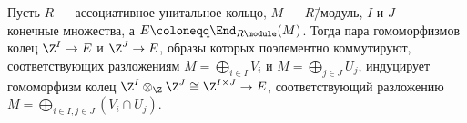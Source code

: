 \documentclass[
	extrafontsizes,
	11pt,
	hyphens,
]{memoir}
\begin{document}



\begin{observation}
Пусть \(R\) --- ассоциативное унитальное кольцо,
\(M\) --- \(R\)\=/модуль, \(I\) и \(J\) --- конечные множества, а \(E \coloneqq \End_{R\module}(M)\).
Тогда пара гомоморфизмов колец \(\Z^I \to E\) и \(\Z^J \to E\),
образы которых поэлементно коммутируют,
соответствующих разложениям \(M = \bigoplus_{i \in I} V_i\) и \(M = \bigoplus_{j \in J} U_j\), индуцирует гомоморфизм колец \(\Z^I \otimes_{\Z} \Z^J \cong \Z^{I \times J} \to E\), соответствующий разложению \(M = \bigoplus_{i \in I, j \in J} (V_i \cap U_j)\).
\end{observation}
\end{document}
